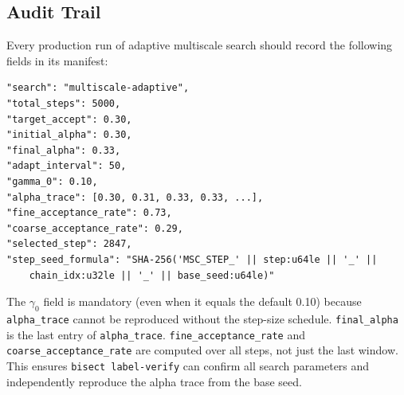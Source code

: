\subsection{Audit Trail}

Every production run of adaptive multiscale search should record the following
fields in its manifest:

\begin{verbatim}
"search": "multiscale-adaptive",
"total_steps": 5000,
"target_accept": 0.30,
"initial_alpha": 0.30,
"final_alpha": 0.33,
"adapt_interval": 50,
"gamma_0": 0.10,
"alpha_trace": [0.30, 0.31, 0.33, 0.33, ...],
"fine_acceptance_rate": 0.73,
"coarse_acceptance_rate": 0.29,
"selected_step": 2847,
"step_seed_formula": "SHA-256('MSC_STEP_' || step:u64le || '_' ||
    chain_idx:u32le || '_' || base_seed:u64le)"
\end{verbatim}

The $\gamma_0$ field is mandatory (even when it equals the default 0.10)
because \texttt{alpha\_trace} cannot be reproduced without the step-size
schedule.
\texttt{final\_alpha} is the last entry of \texttt{alpha\_trace}.
\texttt{fine\_acceptance\_rate} and \texttt{coarse\_acceptance\_rate} are
computed over all steps, not just the last window.
This ensures \texttt{bisect label-verify} can confirm all search parameters
and independently reproduce the alpha trace from the base seed.
